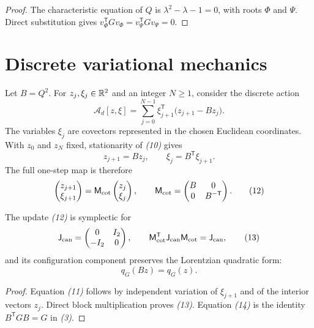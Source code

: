 \begin{proof}
The characteristic equation of $Q$ is $\lambda^2-\lambda-1=0$, with roots
$\Phi$ and $\Psi$.  Direct substitution gives
$v_\Phi^{\mathsf T}Gv_\Phi=v_\Psi^{\mathsf T}Gv_\Psi=0$.
\end{proof}

\section{Discrete variational mechanics}

Let $B=Q^2$.  For $z_j,\xi_j\in\mathbb R^2$ and an integer $N\geq1$, consider the
discrete action
\[
\mathcal A_d[z,\xi]
=\sum_{j=0}^{N-1}\xi_{j+1}^{\mathsf T}
\bigl(z_{j+1}-Bz_j\bigr).
\tag{10}
\]
The variables $\xi_j$ are covectors represented in the chosen Euclidean
coordinates.  With $z_0$ and $z_N$ fixed, stationarity of \emph{(10)} gives
\[
z_{j+1}=Bz_j,\qquad
\xi_j=B^{\mathsf T}\xi_{j+1}.
\tag{11}
\]
The full one-step map is therefore
\[
\begin{pmatrix}z_{j+1}\\ \xi_{j+1}\end{pmatrix}
=
\mathsf M_{\rm cot}
\begin{pmatrix}z_j\\ \xi_j\end{pmatrix},
\qquad
\mathsf M_{\rm cot}
=
\begin{pmatrix}B&0\\0&B^{-\mathsf T}\end{pmatrix}.
\tag{12}
\]

\begin{proposition}
The update \emph{(12)} is symplectic for
\[
\mathsf J_{\rm can}=
\begin{pmatrix}0&I_2\\-I_2&0\end{pmatrix},
\qquad
\mathsf M_{\rm cot}^{\mathsf T}\mathsf J_{\rm can}\mathsf M_{\rm cot}
=\mathsf J_{\rm can},
\tag{13}
\]
and its configuration component preserves the Lorentzian quadratic form:
\[
q_G(Bz)=q_G(z).
\tag{14}
\]
\end{proposition}

\begin{proof}
Equation \emph{(11)} follows by independent variation of $\xi_{j+1}$ and of
the interior vectors $z_j$.  Direct block multiplication proves
\emph{(13)}.  Equation \emph{(14)} is the identity
$B^{\mathsf T}GB=G$ in \emph{(3)}.
\end{proof}

